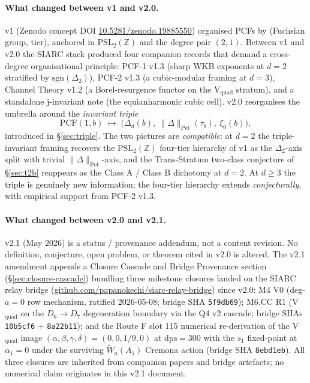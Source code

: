 \documentclass[11pt,a4paper]{article}
\theoremstyle{definition}
\theoremstyle{remark}
\newcommand{\PSLZ}{\mathrm{PSL}_2(\mathbb{Z})}
\newcommand{\PCF}{\mathrm{PCF}}
\newcommand{\PetN}[1]{\lVert #1 \rVert_{\mathrm{Pet}}}
\begin{document}
\paragraph{What changed between v1 and v2.0.}
\label{par:v1-to-v2}
v1 (Zenodo concept DOI \href{https://doi.org/10.5281/zenodo.19885550}{10.5281/zenodo.19885550})
organised PCFs by (Fuchsian group, tier), anchored in $\PSLZ$ and the
degree pair $(2,1)$. Between v1 and v2.0 the SIARC stack produced four
companion records that demand a cross-degree organisational principle:
PCF-1 v1.3 (sharp WKB exponents at $d=2$ stratified by $\mathrm{sgn}(\Delta_2)$),
PCF-2 v1.3 (a cubic-modular framing at $d=3$),
Channel Theory v1.2 (a Borel-resurgence functor on the V$_{\mathrm{quad}}$
stratum), and a standalone j-invariant note (the equianharmonic cubic
cell). v2.0 reorganises the umbrella around the \emph{invariant triple}
\begin{equation}
  \label{eq:invariant-triple}
  \PCF(1,b) \;\longmapsto\; \bigl(\Delta_d(b),\ \PetN{\Delta}(\tau_b),\ \xi_0(b)\bigr),
\end{equation}
introduced in \S\ref{sec:triple}. The two pictures are
\emph{compatible}: at $d=2$ the triple-invariant framing recovers the
$\PSLZ$ four-tier hierarchy of v1 as the $\Delta_2$-axis split with
trivial $\PetN{\Delta}$-axis, and the Trans-Stratum two-class
conjecture of \S\ref{sec:t2b} reappears as the Class A / Class B
dichotomy at $d=2$. At $d \geq 3$ the triple is genuinely new
information; the four-tier hierarchy extends \emph{conjecturally},
with empirical support from PCF-2 v1.3.

\paragraph{What changed between v2.0 and v2.1.}
\label{par:v20-to-v21}
v2.1 (May 2026) is a status / provenance addendum, not a content
revision. No definition, conjecture, open problem, or theorem cited
in v2.0 is altered. The v2.1 amendment appends a Closure Cascade and
Bridge Provenance section (\S\ref{sec:closure-cascade}) bundling
three milestone closures landed on the SIARC relay bridge
(\href{https://github.com/papanokechi/siarc-relay-bridge}{github.com/papanokechi/siarc-relay-bridge})
since v2.0: M4 V0 (deg-$a=0$ row mechanism, ratified 2026-05-08;
bridge SHA \texttt{5f9db69}); M6.CC R1 (V$_{\mathrm{quad}}$ on the
$D_6 \to D_7$ degeneration boundary via the Q4 v2 cascade; bridge SHAs
\texttt{10b5cf6} + \texttt{8a22b11}); and the Route F slot 115
numerical re-derivation of the V$_{\mathrm{quad}}$ image
$(\alpha,\beta,\gamma,\delta) = (0,0,1/9,0)$ at $\mathrm{dps}=300$
with the $s_1$ fixed-point at $\alpha_1 = 0$ under the surviving
$\widetilde{W}_a(A_1)$ Cremona action (bridge SHA \texttt{8ebd1eb}).
All three closures are inherited from companion papers and bridge
artefacts; no numerical claim originates in this v2.1 document.
\end{document}
